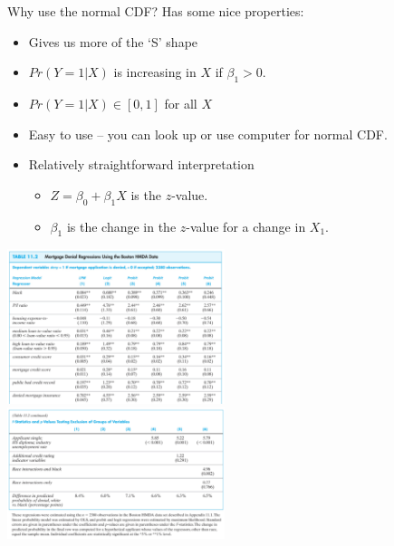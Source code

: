\documentclass[aspectratio=169]{beamer}
\begin{document}
\begin{frame}{Why use the normal CDF?}
Has some nice properties:
\begin{itemize}
\item Gives us more of the `S' shape
\item $Pr(Y=1|X)$ is increasing in $X$ if $\beta_1>0$.
\item $Pr(Y=1|X) \in [0,1]$ for all $X$
\item Easy to use -- you can look up or use computer for normal CDF.
\item Relatively straightforward interpretation
\begin{itemize}
\item $Z=\beta_0 + \beta_1 X$ is the $z$-value.
\item $\beta_1$ is the change in the $z$-value for a change in $X_1$.
\end{itemize}
\end{itemize}
\end{frame}

\begin{frame}
\begin{center}
\includegraphics[width=2.5in]{resources/hmda3.pdf}\\
\includegraphics[width=2.5in]{resources/hmda3a.pdf}\\
\end{center}
\end{frame}
\end{document}
